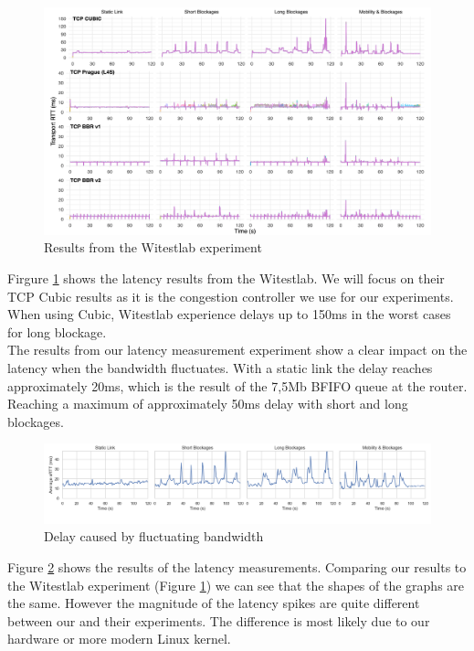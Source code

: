 \documentclass[a4paper,english, 11pt]{report}
\begin{document}
\begin{figure}[h!] %
	\centering
	\includegraphics[scale=0.25]{../diagrams/witestlab/witestlab_results.png}
  	\caption{Results from the Witestlab experiment~\cite{Srivastava_Fund_Panwar_2020}}
  	\label{fig:witestlab_results}
\end{figure}

Firgure \ref{fig:witestlab_results} shows the latency results from the Witestlab. We will focus on their TCP Cubic results as it is the congestion controller we use for our experiments. When using Cubic, Witestlab experience delays up to 150ms in the worst cases for long blockage.\\

The results from our latency measurement experiment show a clear impact on the latency when the bandwidth fluctuates. With a static link the delay reaches approximately 20ms, which is the result of the 7,5Mb BFIFO queue at the router. Reaching a maximum of approximately 50ms delay with short and long blockages.\\

\begin{figure}[h!] %
	\centering
	\includegraphics[scale=0.33]{../diagrams/witestlab/delay2.png}
  	\caption{Delay caused by fluctuating bandwidth}
  	\label{fig:witestlab_graph_delay_1}
\end{figure}

Figure \ref{fig:witestlab_graph_delay_1} shows the results of the latency measurements. Comparing our results to the Witestlab experiment (Figure \ref{fig:witestlab_results}) we can see that the shapes of the graphs are the same. However the magnitude of the latency spikes are quite different between our and their experiments. The difference is most likely due to our hardware or more modern Linux kernel.\\
\end{document}
